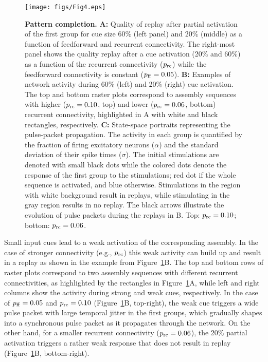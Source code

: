     \begin{figure}[!h]
      \center
      \texttt{[image: figs/Fig4.eps]}
      \caption{{\bf Pattern completion.}
        \textbf{A:} Quality of replay after partial activation of the first
        group for cue size $60\%$ (left panel) and $20\%$ (middle) as a
        function of feedforward and recurrent connectivity.  The right-most
        panel shows the quality replay after a cue activation (20\% and 60\%)
        as a function of the recurrent connectivity ($p_{\rm rc}$) while the
        feedforward connectivity is constant ($p_{\rm ff} = 0.05$).
        \textbf{B:} Examples of network activity during 60\% (left) and 20\%
        (right) cue activation.  The top and bottom raster plots correspond to
        assembly sequences with higher ($p_{\rm rc} = 0.10$, top) and lower
        ($p_{\rm rc} = 0.06$, bottom) recurrent connectivity, highlighted in A
        with white and black rectangles, respectively.
        \textbf{C:} State-space portraits representing the pulse-packet
        propagation.  The activity in each group is quantified by the fraction
        of firing excitatory neurons ($\alpha$) and the standard deviation of
        their spike times ($\sigma$).  The initial stimulations are denoted
        with small black dots while the colored dots denote the response of the
        first group to the stimulations; red dot if the whole sequence is
        activated, and blue otherwise.  Stimulations in the region with white
        background result in replays, while stimulating in the gray region
        results in no replay.  The black arrows illustrate the evolution of
        pulse packets during the replays in B.  Top: $p_{\rm rc} = 0.10$;
        bottom: $p_{\rm rc} = 0.06$.
          }
      \label{fig4}
    \end{figure}
    
    Small input cues lead to a weak activation of the corresponding assembly.
    In the case of stronger connectivity (e.g., $p_{\rm rc}$) this weak
    activity can build up and result in a replay as shown in the example from
    Figure~\ref{fig4}B. The top and bottom rows of raster plots correspond to two
    assembly sequences with different recurrent connectivities, as highlighted
    by the rectangles in Figure~\nolinebreak\ref{fig4}A, while left and right
    columns show the activity during strong and weak cues, respectively. In the
    case of $p_{\rm ff}=0.05$ and $p_{\rm rc}=0.10$ (Figure~\ref{fig4}B,
    top-right), the weak cue triggers a wide pulse packet with large temporal
    jitter in the first groups, which gradually shapes into a synchronous pulse
    packet as it propagates through the network. On the other hand, for a
    smaller recurrent connectivity ($p_{\rm rc}=0.06$), the 20\% partial
    activation triggers a rather weak response that does not result in replay
    (Figure~\ref{fig4}B, bottom-right).
    

